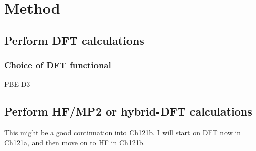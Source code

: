 \documentclass{article}
\begin{document}
\section{Method}
\subsection{Perform DFT calculations}
\subsubsection{Choice of DFT functional}
PBE-D3
\subsection{Perform HF/MP2 or hybrid-DFT calculations}
This might be a good continuation into Ch121b. I will start on DFT now in Ch121a, and then move on to HF in Ch121b.


\end{document}

